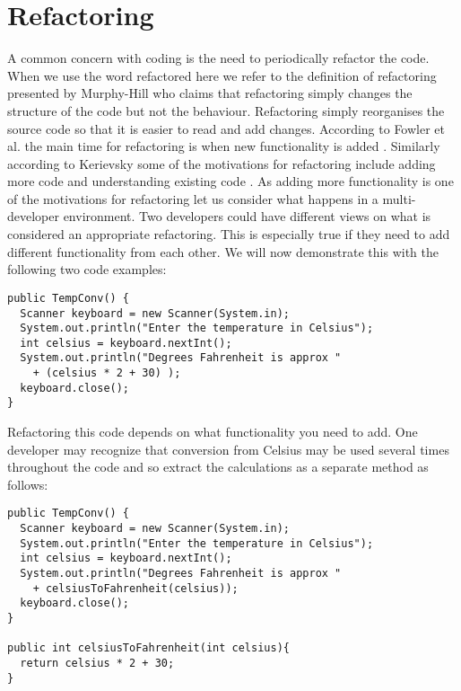  

\section{Refactoring}
A common concern with coding is the need to periodically refactor the code. 
When we use the word refactored here we refer to the definition of refactoring presented by Murphy-Hill \cite{Murphy-Hill2008} who claims that refactoring simply changes the structure of the code but not the behaviour.
Refactoring simply reorganises the source code so that it is easier to read and add changes. 
According to Fowler et al. the main time for refactoring is when new functionality is added \cite{Fowler1999}. 
Similarly according to Kerievsky some of the motivations for refactoring include adding more code and understanding existing code \cite{Kerievsky2004}.
As adding more functionality is one of the motivations for refactoring let us consider what happens in a multi-developer environment. 
Two developers could have different views on what is considered an appropriate refactoring. 
This is especially true if they need to add different functionality from each other. 
We will now demonstrate this with the following two code examples:

\begin{minipage}[t]{1.0\textwidth}
\begin{lstlisting}
public TempConv() {
  Scanner keyboard = new Scanner(System.in);
  System.out.println("Enter the temperature in Celsius");
  int celsius = keyboard.nextInt();
  System.out.println("Degrees Fahrenheit is approx " 
    + (celsius * 2 + 30) );
  keyboard.close();
}
\end{lstlisting}
\end{minipage}


Refactoring this code depends on what functionality you need to add. 
One developer may recognize that conversion from Celsius may be used several times throughout the code and so extract the calculations as a separate method as follows:

\begin{minipage}[t]{1.0\textwidth}
\begin{lstlisting}
public TempConv() {
  Scanner keyboard = new Scanner(System.in);
  System.out.println("Enter the temperature in Celsius");
  int celsius = keyboard.nextInt();
  System.out.println("Degrees Fahrenheit is approx " 
    + celsiusToFahrenheit(celsius));
  keyboard.close();
}

public int celsiusToFahrenheit(int celsius){
  return celsius * 2 + 30;
}
\end{lstlisting}
\end{minipage}


